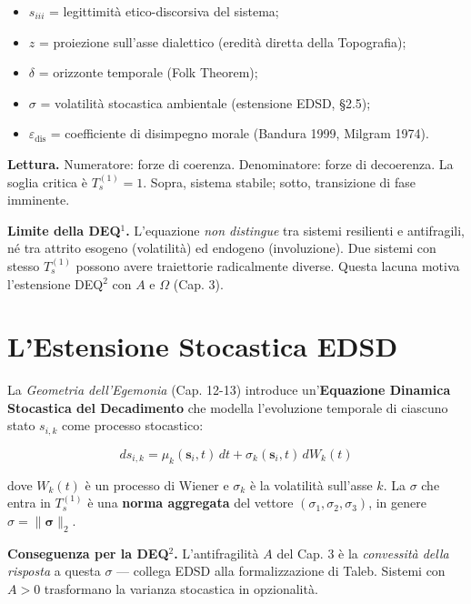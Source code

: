 \begin{itemize}
\tightlist
\item
  \(s_{iii}\) = legittimità etico-discorsiva del sistema;
\item
  \(z\) = proiezione sull'asse dialettico (eredità diretta della
  Topografia);
\item
  \(\delta\) = orizzonte temporale (Folk Theorem);
\item
  \(\sigma\) = volatilità stocastica ambientale (estensione EDSD, \S{}2.5);
\item
  \(\varepsilon_{\text{dis}}\) = coefficiente di disimpegno morale
  (Bandura 1999, Milgram 1974).
\end{itemize}

\Proved{} \textbf{Lettura.} Numeratore: forze di coerenza. Denominatore:
forze di decoerenza. La soglia critica è \(T_s^{(1)} = 1\). Sopra,
sistema stabile; sotto, transizione di fase imminente.

\Conj{} \textbf{Limite della DEQ$^1$.} L'equazione \emph{non distingue} tra
sistemi resilienti e antifragili, né tra attrito esogeno (volatilità) ed
endogeno (involuzione). Due sistemi con stesso \(T_s^{(1)}\) possono
avere traiettorie radicalmente diverse. Questa lacuna motiva
l'estensione DEQ$^2$ con \(A\) e \(\Omega\) (Cap. 3).



\section{L'Estensione Stocastica
EDSD}\label{lestensione-stocastica-edsd}

La \emph{Geometria dell'Egemonia} (Cap. 12-13) introduce
un'\textbf{Equazione Dinamica Stocastica del Decadimento} che modella
l'evoluzione temporale di ciascuno stato \(s_{i,k}\) come processo
stocastico:

\[
ds_{i,k} = \mu_k(\mathbf{s}_i, t)\, dt + \sigma_k(\mathbf{s}_i, t)\, dW_k(t)
\]

dove \(W_k(t)\) è un processo di Wiener e \(\sigma_k\) è la volatilità
sull'asse \(k\). La \(\sigma\) che entra in \(T_s^{(1)}\) è una
\textbf{norma aggregata} del vettore \((\sigma_1, \sigma_2, \sigma_3)\),
in genere \(\sigma = \|\boldsymbol{\sigma}\|_2\).

\Hypoth{} \textbf{Conseguenza per la DEQ$^2$.} L'antifragilità \(A\) del
Cap. 3 è la \emph{convessità della risposta} a questa \(\sigma\) ---
collega EDSD alla formalizzazione di Taleb. Sistemi con \(A > 0\)
trasformano la varianza stocastica in opzionalità.



